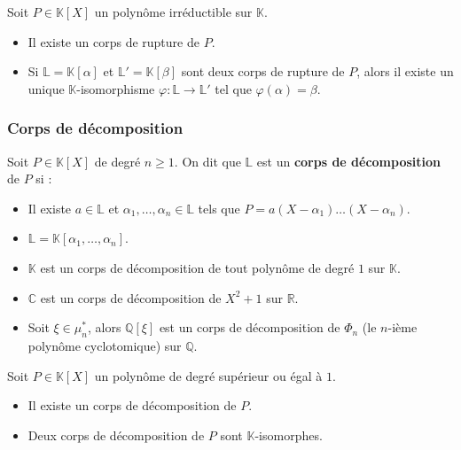   \begin{theorem}
    Soit $P \in \mathbb{K}[X]$ un polynôme irréductible sur $\mathbb{K}$.
    \begin{itemize}
      \item Il existe un corps de rupture de $P$.
      \item Si $\mathbb{L} = \mathbb{K}[\alpha]$ et $\mathbb{L}' = \mathbb{K}[\beta]$ sont deux corps de rupture de $P$, alors il existe un unique $\mathbb{K}$-isomorphisme $\varphi : \mathbb{L} \rightarrow \mathbb{L}'$ tel que $\varphi(\alpha) = \beta$.
    \end{itemize}
  \end{theorem}

  \subsubsection{Corps de décomposition}

  \begin{definition}
    Soit $P \in \mathbb{K}[X]$ de degré $n \geq 1$. On dit que $\mathbb{L}$ est un \textbf{corps de décomposition} de $P$ si :
    \begin{itemize}
      \item Il existe $a \in \mathbb{L}$ et $\alpha_1, \dots, \alpha_n \in \mathbb{L}$ tels que $P = a(X-\alpha_1) \dots (X-\alpha_n)$.
      \item $\mathbb{L} = \mathbb{K}[\alpha_1, \dots, \alpha_n]$.
    \end{itemize}
  \end{definition}

  \begin{example}
    \begin{itemize}
      \item $\mathbb{K}$ est un corps de décomposition de tout polynôme de degré $1$ sur $\mathbb{K}$.
      \item $\mathbb{C}$ est un corps de décomposition de $X^2+1$ sur $\mathbb{R}$.
      \item Soit $\xi \in \mu_n^*$, alors $\mathbb{Q}[\xi]$ est un corps de décomposition de $\Phi_n$ (le $n$-ième polynôme cyclotomique) sur $\mathbb{Q}$.
    \end{itemize}
  \end{example}

  \begin{theorem}
    Soit $P \in \mathbb{K}[X]$ un polynôme de degré supérieur ou égal à $1$.
    \begin{itemize}
      \item Il existe un corps de décomposition de $P$.
      \item Deux corps de décomposition de $P$ sont $\mathbb{K}$-isomorphes.
    \end{itemize}
  \end{theorem}


